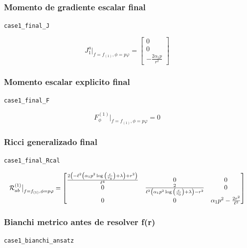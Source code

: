 \documentclass[11pt,a4paper]{article}
\begin{document}
\subsubsection{Momento de gradiente escalar final}

\noindent\texttt{case1\_final\_J}\par\nopagebreak[4]

\[
J_1^a\big|_{f=f_{(1)},\phi=p\varphi} = \left[\begin{matrix}0\\0\\- \frac{2 \alpha_{1} p}{r^{2}}\end{matrix}\right]
\]

\subsubsection{Momento escalar explicito final}

\noindent\texttt{case1\_final\_F}\par\nopagebreak[4]

\[
F_\phi^{(1)}\big|_{f=f_{(1)},\phi=p\varphi} = 0
\]

\subsubsection{Ricci generalizado final}

\noindent\texttt{case1\_final\_Rcal}\par\nopagebreak[4]

\[
\resizebox{\textwidth}{!}{$\displaystyle \mathcal R^{(1)}_{ab}\big|_{f=f_{(1)},\phi=p\varphi} = \left[\begin{matrix}\frac{2 \left(- \ell^{2} \left(\alpha_{1} p^{2} \log{\left(\frac{r}{r_{0}} \right)} + \lambda\right) + r^{2}\right)}{\ell^{4}} & 0 & 0\\0 & \frac{2}{\ell^{2} \left(\alpha_{1} p^{2} \log{\left(\frac{r}{r_{0}} \right)} + \lambda\right) - r^{2}} & 0\\0 & 0 & \alpha_{1} p^{2} - \frac{2 r^{2}}{\ell^{2}}\end{matrix}\right]$}
\]

\subsubsection{Bianchi metrico antes de resolver f(r)}

\noindent\texttt{case1\_bianchi\_ansatz}\par\nopagebreak[4]
\end{document}
